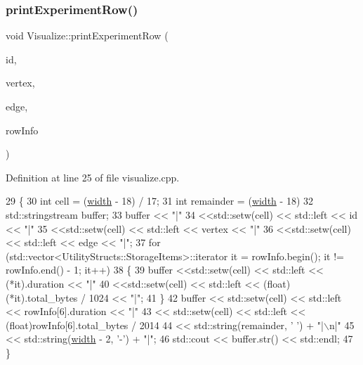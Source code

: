 \subsubsection{\texorpdfstring{print\+Experiment\+Row()}{printExperimentRow()}}
{\footnotesize\ttfamily void Visualize\+::print\+Experiment\+Row (\begin{DoxyParamCaption}\item[{int}]{id,  }\item[{int}]{vertex,  }\item[{int}]{edge,  }\item[{std\+::vector$<$ \hyperlink{struct_utility_structs_1_1_storage_items}{Utility\+Structs\+::\+Storage\+Items} $>$}]{row\+Info }\end{DoxyParamCaption})}



Definition at line 25 of file visualize.\+cpp.


\begin{DoxyCode}
29 \{
30     \textcolor{keywordtype}{int} cell = (\hyperlink{class_visualize_af5ac723ad5f8fe8c4a8378bf1299cda7}{width} - 18) / 17;
31     \textcolor{keywordtype}{int} remainder = (\hyperlink{class_visualize_af5ac723ad5f8fe8c4a8378bf1299cda7}{width} - 18) %
32     std::stringstream buffer;
33     buffer << \textcolor{stringliteral}{"|"}
34            <<std::setw(cell) << std::left << \textcolor{keywordtype}{id} << \textcolor{stringliteral}{"|"}
35            <<std::setw(cell) << std::left << vertex << \textcolor{stringliteral}{"|"}
36            <<std::setw(cell) << std::left << edge << \textcolor{stringliteral}{"|"};
37     \textcolor{keywordflow}{for} (std::vector<UtilityStructs::StorageItems>::iterator it = rowInfo.begin(); it != rowInfo.end() - 1;
       it++)
38     \{
39         buffer <<std::setw(cell) << std::left << (*it).duration << \textcolor{stringliteral}{"|"}
40                <<std::setw(cell) << std::left << (float)(*it).total\_bytes / 1024 << \textcolor{stringliteral}{"|"};
41     \}
42     buffer << std::setw(cell) << std::left << rowInfo[6].duration << \textcolor{stringliteral}{"|"}
43            << std::setw(cell) << std::left << (float)rowInfo[6].total\_bytes / 2014
44            << std::string(remainder, \textcolor{charliteral}{' '}) + \textcolor{stringliteral}{"|\(\backslash\)n|"}
45            << std::string(\hyperlink{class_visualize_af5ac723ad5f8fe8c4a8378bf1299cda7}{width} - 2, \textcolor{charliteral}{'-'}) + \textcolor{stringliteral}{"|"};
46     std::cout << buffer.str() << std::endl;
47 \}
\end{DoxyCode}
\mbox{\label{class_visualize_abce6cd538dc0715b21851e0bf0377d85}} 
